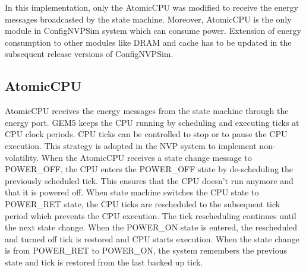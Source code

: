 \documentclass[conference]{IEEEtran}
\begin{document}
In this implementation, only the AtomicCPU was modified to receive the energy messages broadcasted by the state machine. Moreover, AtomicCPU is the only module in ConfigNVPSim system which can consume power. Extension of energy consumption to other modules like DRAM and cache has to be updated in the subsequent release versions of ConfigNVPSim. 

\subsection{AtomicCPU}
AtomicCPU receives the energy messages from the state machine through the energy port. GEM5 keeps the CPU running by scheduling and executing ticks at CPU clock periods. CPU ticks can be controlled to stop or to pause the CPU execution. This strategy is adopted in the NVP system to implement non-volatility. 
When the AtomicCPU receives a state change message to POWER\_OFF, the CPU enters the POWER\_OFF state by de-scheduling the previously scheduled tick. This ensures that the CPU doesn't run anymore and that it is powered off. When state machine switches the CPU state to POWER\_RET state, the CPU ticks are rescheduled to the subsequent tick period which prevents the CPU execution. The tick rescheduling continues until the next state change. When the POWER\_ON state is entered, the rescheduled and turned off tick is restored and CPU starts execution. 
When the state change is from POWER\_RET to POWER\_ON, the system remembers the previous state and tick is restored from the last backed up tick.
\end{document}
